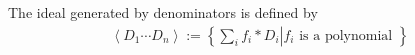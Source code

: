 \documentclass[10pt]{article}
\begin{document}
The ideal generated by denominators is defined by
\begin{eqnarray} \nonumber
\left< D_1 \cdots D_n \right> := \left\{\left. \sum_i f_i * D_i \right| f_i \text{ is a polynomial } \right\}
\end{eqnarray}
\end{document}
